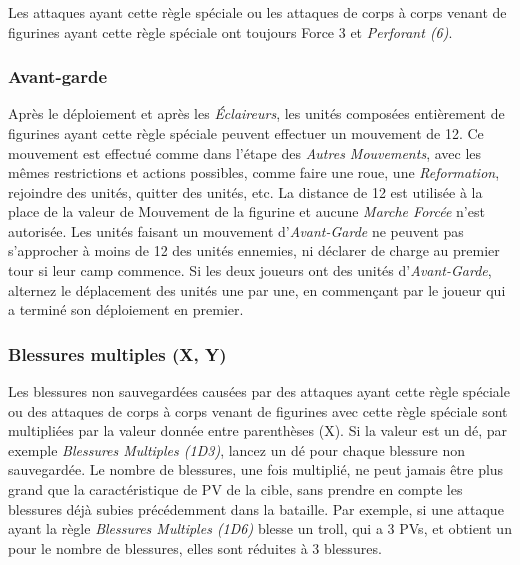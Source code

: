 \subsubsection*{}

Les attaques ayant cette règle spéciale ou les attaques de corps à corps venant de figurines ayant cette règle spéciale ont toujours Force 3 et \emph{Perforant (6)}.

\subsubsection*{Avant-garde}

Après le déploiement et après les \emph{Éclaireurs}, les unités composées entièrement de figurines ayant cette règle spéciale peuvent effectuer un mouvement de \unit{12}{\pouce}. Ce mouvement est effectué comme dans l'étape des \emph{Autres Mouvements}, avec les mêmes restrictions et actions possibles, comme faire une roue, une \emph{Reformation}, rejoindre des unités, quitter des unités, etc. La distance de \unit{12}{\pouce} est utilisée à la place de la valeur de Mouvement de la figurine et aucune \emph{Marche Forcée} n'est autorisée. Les unités faisant un mouvement d'\emph{Avant-Garde} ne peuvent pas s'approcher à moins de \unit{12}{\pouce} des unités ennemies, ni   déclarer de charge au premier tour si leur camp commence. Si les deux joueurs ont des unités d'\emph{Avant-Garde}, alternez le déplacement des unités une par une, en commençant par le joueur qui a terminé son déploiement en premier.

\subsubsection*{Blessures multiples (X, Y)}

Les blessures non sauvegardées causées par des attaques ayant cette règle spéciale ou des attaques de corps à corps venant de figurines avec cette règle spéciale sont multipliées par la valeur donnée entre parenthèses (X). Si la valeur est un dé, par exemple \emph{Blessures Multiples (1D3)}, lancez un dé pour chaque blessure non sauvegardée. Le nombre de blessures, une fois multiplié, ne peut jamais être plus grand que la caractéristique de PV de la cible, sans prendre en compte les blessures déjà subies précédemment dans la bataille. Par exemple, si une attaque ayant la règle \emph{Blessures Multiples (1D6)} blesse un troll, qui a 3 PVs, et obtient un  pour le nombre de blessures, elles sont réduites à 3 blessures.

